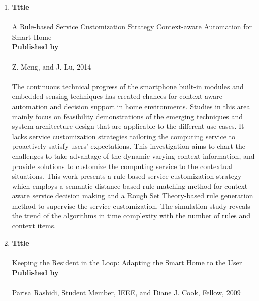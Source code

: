 \begin{enumerate}
	\item
		\textbf{Title}
			\paragraph{}A Rule-based Service Customization Strategy Context-aware Automation for Smart Home\\
		
		\textbf{Published by}
			\paragraph{}Z. Meng, and J. Lu, 2014
			\paragraph{}The continuous technical progress of the smartphone built-in modules and embedded sensing techniques has created chances for context-aware automation and decision support in home environments. Studies in this area mainly focus on feasibility demonstrations of the emerging techniques and system architecture design that are applicable to the different use cases. It lacks service customization strategies tailoring the computing service to proactively satisfy users’ expectations. This investigation aims to chart the challenges to take advantage of the dynamic varying context information, and provide solutions to customize the computing service to the contextual situations. This work presents a rule-based service customization strategy which employs a semantic distance-based rule matching method for context-aware service decision making and a Rough Set Theory-based rule generation method to supervise the service customization. The simulation study reveals the trend of the algorithms in time complexity with the number of rules and context items.\\

	\item
		\textbf{Title}
			\paragraph{}Keeping the Resident in the Loop: Adapting the Smart Home to the User\\

		\textbf{Published by}
			\paragraph{}Parisa Rashidi, Student Member, IEEE, and Diane J. Cook, Fellow, 2009

\end{enumerate}
